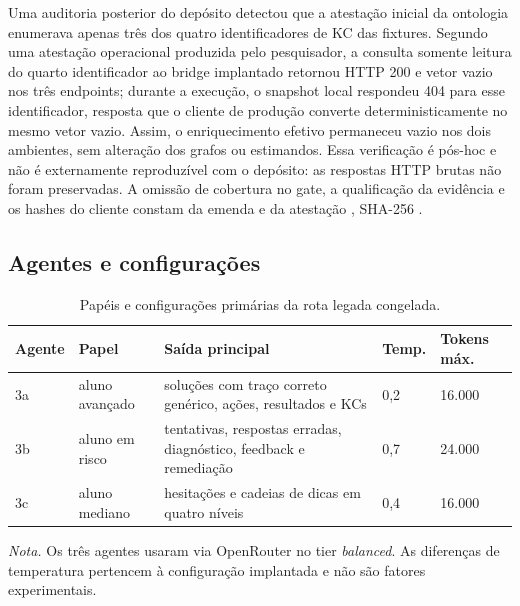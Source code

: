 \documentclass[11pt,a4paper]{article}
\begin{document}
Uma auditoria posterior do depósito detectou que a atestação inicial da ontologia enumerava apenas três dos quatro identificadores de KC das fixtures. Segundo uma atestação operacional produzida pelo pesquisador, a consulta somente leitura do quarto identificador ao bridge implantado retornou HTTP 200 e vetor vazio nos três endpoints; durante a execução, o snapshot local respondeu 404 para esse identificador, resposta que o cliente de produção converte deterministicamente no mesmo vetor vazio. Assim, o enriquecimento efetivo permaneceu vazio nos dois ambientes, sem alteração dos grafos ou estimandos. Essa verificação é pós-hoc e não é externamente reproduzível com o depósito: as respostas HTTP brutas não foram preservadas. A omissão de cobertura no gate, a qualificação da evidência e os hashes do cliente constam da emenda  e da atestação , SHA-256 .

\subsection{Agentes e configurações}

\begin{table}[H]
\centering
\caption{Papéis e configurações primárias da rota legada congelada.}
\label{tab:agents}
\small
\setlength{\tabcolsep}{3pt}
\begin{tabularx}{\textwidth}{@{}P{1.1cm}P{2.8cm}Y C{1.5cm}C{1.55cm}@{}}
\toprule
Agente & Papel & Saída principal & Temp. & Tokens máx. \\
\midrule
3a & aluno avançado & soluções com traço correto genérico, ações, resultados e KCs & 0,2 & 16.000 \\
3b & aluno em risco & tentativas, respostas erradas, diagnóstico, feedback e remediação & 0,7 & 24.000 \\
3c & aluno mediano & hesitações e cadeias de dicas em quatro níveis & 0,4 & 16.000 \\
\bottomrule
\end{tabularx}
\begin{minipage}{\textwidth}\footnotesize\emph{Nota.} Os três agentes usaram  via OpenRouter no tier \emph{balanced}. As diferenças de temperatura pertencem à configuração implantada e não são fatores experimentais.
\end{minipage}
\end{table}
\end{document}
